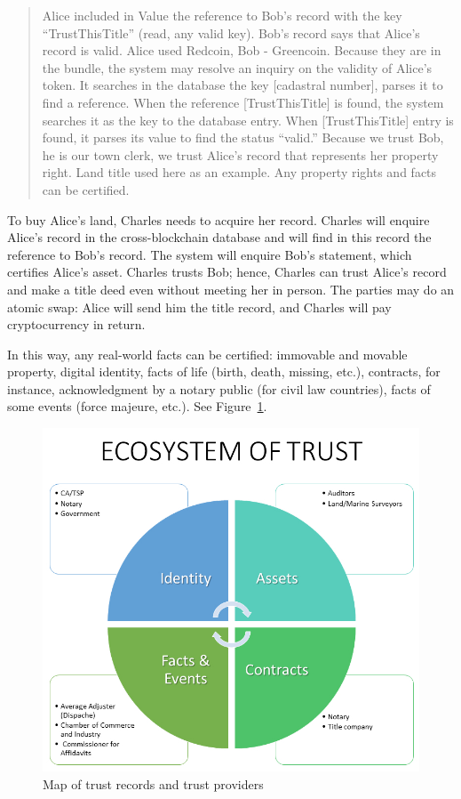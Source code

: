 \begin{multicols}{2}
\begin{quote}
Alice included in Value the reference to Bob’s record with the key “TrustThisTitle” (read, any valid key). Bob’s record says that Alice’s record is valid. Alice used Redcoin, Bob - Greencoin. Because they are in the bundle, the system may resolve an inquiry on the validity of Alice’s token. It searches in the database the key [cadastral number], parses it to find a reference. When the reference [TrustThisTitle] is found, the system searches it as the key to the database entry. When [TrustThisTitle] entry is found, it parses its value to find the status “valid.” Because we trust Bob, he is our town clerk, we trust Alice’s record that represents her property right. Land title used here as an example. Any property rights and facts can be certified.
\end{quote}

To buy Alice’s land, Charles needs to acquire her record. Charles will enquire Alice’s record in the cross-blockchain database and will find in this record the reference to Bob’s record. The system will enquire Bob’s statement, which certifies Alice’s asset. Charles trusts Bob; hence, Charles can trust Alice’s record and make a title deed even without meeting her in person. The parties may do an atomic swap: Alice will send him the title record, and Charles will pay cryptocurrency in return.

In this way, any real-world facts can be certified: immovable and movable property, digital identity, facts of life (birth, death, missing, etc.), contracts, for instance, acknowledgment by a notary public (for civil law countries), facts of some events (force majeure, etc.). See Figure~\ref{chap1-fig08}.
\begin{figure}[H]
\centering
\includegraphics[scale=1.35]{src/Figures/chap1/chap1-fig08.jpg}
\caption{Map of trust records and trust providers}\label{chap1-fig08}
\end{figure}


\end{multicols}
